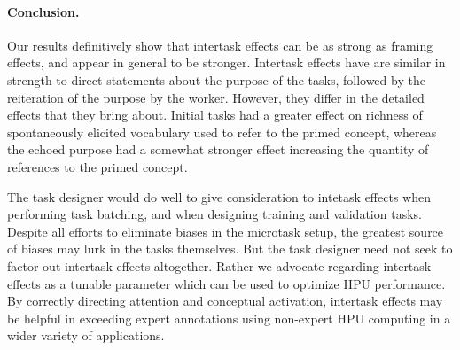 \documentclass[12pt]{article}
\begin{document}
\paragraph{Conclusion.}
Our results definitively show that intertask effects can
be as strong as framing effects, and appear in general to be stronger.
Intertask effects have are similar in strength to direct 
statements about the purpose of the tasks, followed by the reiteration of the
purpose by the worker.  However, they differ in the detailed effects that
they bring about.  Initial tasks had a greater effect on richness of 
spontaneously elicited vocabulary used to refer to the primed concept,
whereas the echoed purpose had a somewhat stronger effect increasing the 
quantity of references to the primed concept.

The task designer would do well to give consideration to intetask effects
when performing task batching, and when designing training and validation
tasks.  Despite all efforts to eliminate biases in the microtask setup,
the greatest source of biases may lurk in the tasks themselves.  
But the task designer need not seek to factor out intertask effects altogether.
Rather we advocate regarding intertask effects as a tunable parameter which
can be used to optimize HPU performance.  By correctly directing attention
and conceptual activation, intertask effects may be helpful in exceeding
expert annotations using non-expert HPU computing in a wider variety of
applications.
\end{document}
